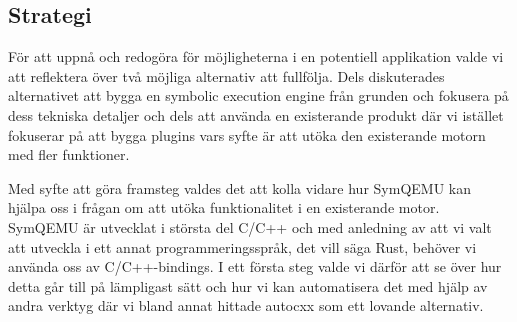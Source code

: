 \subsection{Strategi}
För att uppnå och redogöra för möjligheterna i en potentiell applikation valde vi att reflektera över två möjliga 
alternativ att fullfölja. Dels diskuterades alternativet att bygga en symbolic execution engine från grunden och fokusera på
dess tekniska detaljer och dels att använda en existerande produkt där vi istället fokuserar på att bygga plugins vars
syfte är att utöka den existerande motorn med fler funktioner. 

Med syfte att göra framsteg valdes det att kolla vidare hur SymQEMU kan hjälpa oss i frågan om att utöka funktionalitet
i en existerande motor. SymQEMU är utvecklat i största del C/C++ och med anledning av att vi valt att utveckla i ett annat
programmeringsspråk, det vill säga Rust, behöver vi använda oss av C/C++-bindings. I ett första steg valde vi därför att 
se över hur detta går till på lämpligast sätt och hur vi kan automatisera det med hjälp av andra verktyg där vi bland annat hittade
autocxx som ett lovande alternativ. 



